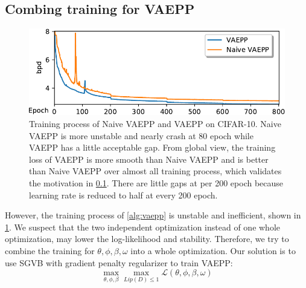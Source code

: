 \subsection{Combing training for VAEPP} \label{subsec:improve_of_vaepp}

\begin{figure}[tb]
	\centering
	\includegraphics[width=0.9\columnwidth]{../dist.strip/loss_curves}
	\caption{
	Training process of Naive VAEPP and VAEPP on CIFAR-10. Naive VAEPP is more unstable and nearly crash at 80 epoch while VAEPP has a little acceptable gap. From global view, the training loss of VAEPP is more smooth than Naive VAEPP and is better than Naive VAEPP over almost all training process, which validates the motivation in \cref{subsec:improve_of_vaepp}. There are little gaps at per 200 epoch because learning rate is reduced to half at every 200 epoch. 
	}
	\label{fig:loss_curves}
\end{figure}

However, the training process of \cref{alg:vaepp} is unstable and inefficient, shown in \cref{fig:loss_curves}. 
We suspect that the two independent optimization instead of one whole optimization, may lower the log-likelihood and stability. Therefore, we try to combine the training for $\theta, \phi, \beta, \omega$ into a whole optimization. 
Our solution is to use SGVB with gradient penalty regularizer to train VAEPP:
\begin{equation*}
	\max_{\theta, \phi, \beta} \max_{Lip(D) \leq 1} \mathcal{L}(\theta, \phi, \beta, \omega) 
\end{equation*} 

